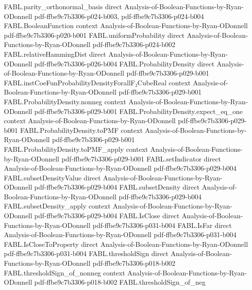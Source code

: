 \begin{theorem}
\proofstep
  {FABL.parity_orthonormal_basis}
  {direct}
  {Analysis-of-Boolean-Functions-by-Ryan-ODonnell}
  {pdf-ffbe9c7b3306-p024-b003,
    pdf-ffbe9c7b3306-p024-b004}
\proofstep
  {FABL.BooleanFunction}
  {context}
  {Analysis-of-Boolean-Functions-by-Ryan-ODonnell}
  {pdf-ffbe9c7b3306-p020-b001}
\proofstep
  {FABL.uniformProbability}
  {direct}
  {Analysis-of-Boolean-Functions-by-Ryan-ODonnell}
  {pdf-ffbe9c7b3306-p024-b002}
\proofstep
  {FABL.relativeHammingDist}
  {direct}
  {Analysis-of-Boolean-Functions-by-Ryan-ODonnell}
  {pdf-ffbe9c7b3306-p026-b004}
\proofstep
  {FABL.ProbabilityDensity}
  {direct}
  {Analysis-of-Boolean-Functions-by-Ryan-ODonnell}
  {pdf-ffbe9c7b3306-p029-b001}
\proofstep
  {FABL.instCoeFunProbabilityDensityForallF₂CubeReal}
  {context}
  {Analysis-of-Boolean-Functions-by-Ryan-ODonnell}
  {pdf-ffbe9c7b3306-p029-b001}
\proofstep
  {FABL.ProbabilityDensity.nonneg}
  {context}
  {Analysis-of-Boolean-Functions-by-Ryan-ODonnell}
  {pdf-ffbe9c7b3306-p029-b001}
\proofstep
  {FABL.ProbabilityDensity.expect_eq_one}
  {context}
  {Analysis-of-Boolean-Functions-by-Ryan-ODonnell}
  {pdf-ffbe9c7b3306-p029-b001}
\proofstep
  {FABL.ProbabilityDensity.toPMF}
  {context}
  {Analysis-of-Boolean-Functions-by-Ryan-ODonnell}
  {pdf-ffbe9c7b3306-p029-b001}
\proofstep
  {FABL.ProbabilityDensity.toPMF_apply}
  {context}
  {Analysis-of-Boolean-Functions-by-Ryan-ODonnell}
  {pdf-ffbe9c7b3306-p029-b001}
\proofstep
  {FABL.setIndicator}
  {direct}
  {Analysis-of-Boolean-Functions-by-Ryan-ODonnell}
  {pdf-ffbe9c7b3306-p029-b004}
\proofstep
  {FABL.subsetDensityValue}
  {direct}
  {Analysis-of-Boolean-Functions-by-Ryan-ODonnell}
  {pdf-ffbe9c7b3306-p029-b004}
\proofstep
  {FABL.subsetDensity}
  {direct}
  {Analysis-of-Boolean-Functions-by-Ryan-ODonnell}
  {pdf-ffbe9c7b3306-p029-b004}
\proofstep
  {FABL.subsetDensity_apply}
  {context}
  {Analysis-of-Boolean-Functions-by-Ryan-ODonnell}
  {pdf-ffbe9c7b3306-p029-b004}
\proofstep
  {FABL.IsClose}
  {direct}
  {Analysis-of-Boolean-Functions-by-Ryan-ODonnell}
  {pdf-ffbe9c7b3306-p031-b004}
\proofstep
  {FABL.IsFar}
  {direct}
  {Analysis-of-Boolean-Functions-by-Ryan-ODonnell}
  {pdf-ffbe9c7b3306-p031-b004}
\proofstep
  {FABL.IsCloseToProperty}
  {direct}
  {Analysis-of-Boolean-Functions-by-Ryan-ODonnell}
  {pdf-ffbe9c7b3306-p031-b004}
\proofstep
  {FABL.thresholdSign}
  {direct}
  {Analysis-of-Boolean-Functions-by-Ryan-ODonnell}
  {pdf-ffbe9c7b3306-p018-b002}
\proofstep
  {FABL.thresholdSign_of_nonneg}
  {context}
  {Analysis-of-Boolean-Functions-by-Ryan-ODonnell}
  {pdf-ffbe9c7b3306-p018-b002}
\proofstep
  {FABL.thresholdSign_of_neg}

\end{theorem}
